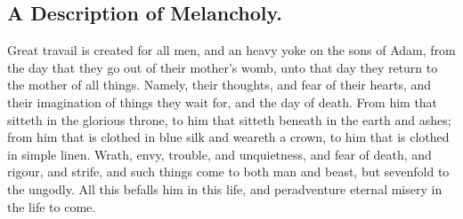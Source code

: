 {\subsection{A Description of Melancholy.}
Great travail is created for all men, and an heavy yoke on the sons of Adam, from the day that they go out of their mother's womb, unto that day they return to the mother of all things. Namely, their thoughts, and fear of their hearts, and their imagination of things they wait for, and the day of death. From him that sitteth in the glorious throne, to him that sitteth beneath in the earth and ashes; from him that is clothed in blue silk and weareth a crown, to him that is clothed in simple linen. Wrath, envy, trouble, and unquietness, and fear of death, and rigour, and strife, and such things come to both man and beast, but sevenfold to the ungodly. All this befalls him in this life, and peradventure eternal misery in the life to come.

}
